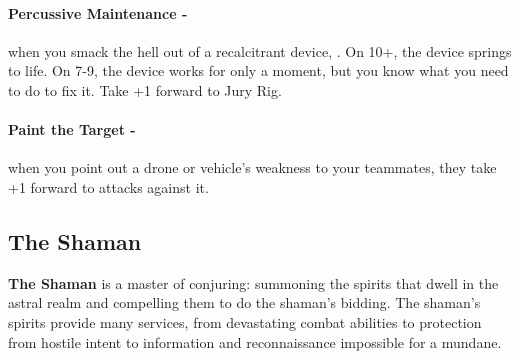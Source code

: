 \paragraph{Percussive Maintenance -} when you smack the hell out of a recalcitrant device, . On 10+, the device springs to life. On 7-9, the device works for only a moment, but you know what you need to do to fix it. Take +1 forward to Jury Rig.

\paragraph{Paint the Target -} when you point out a drone or vehicle’s weakness to your teammates, they take +1 forward to attacks against it.



\clearpage
\subsection{The Shaman}
\textbf{The Shaman} is a master of conjuring: summoning the spirits that dwell in the astral realm and compelling them to do the shaman’s bidding. The shaman’s spirits provide many services, from devastating combat abilities to protection from hostile intent to information and reconnaissance impossible for a mundane.

